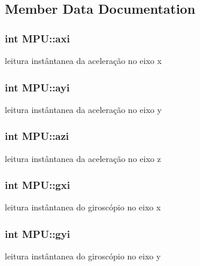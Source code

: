 \subsection{Member Data Documentation}
\subsubsection[{\texorpdfstring{axi}{axi}}]{\setlength{\rightskip}{0pt plus 5cm}int M\+P\+U\+::axi}\hypertarget{class_m_p_u_a970d6ef662d744e848058828d4f20de6}{}\label{class_m_p_u_a970d6ef662d744e848058828d4f20de6}
leitura instântanea da aceleração no eixo x 
\subsubsection[{\texorpdfstring{ayi}{ayi}}]{\setlength{\rightskip}{0pt plus 5cm}int M\+P\+U\+::ayi}\hypertarget{class_m_p_u_a84628559828dd5476ee2a8888d26d2a7}{}\label{class_m_p_u_a84628559828dd5476ee2a8888d26d2a7}
leitura instântanea da aceleração no eixo y 
\subsubsection[{\texorpdfstring{azi}{azi}}]{\setlength{\rightskip}{0pt plus 5cm}int M\+P\+U\+::azi}\hypertarget{class_m_p_u_a8307625db324101f2c1c0db433253b63}{}\label{class_m_p_u_a8307625db324101f2c1c0db433253b63}
leitura instântanea da aceleração no eixo z 
\subsubsection[{\texorpdfstring{gxi}{gxi}}]{\setlength{\rightskip}{0pt plus 5cm}int M\+P\+U\+::gxi}\hypertarget{class_m_p_u_a16a4ca3ef12197ee9876e71033c20f4f}{}\label{class_m_p_u_a16a4ca3ef12197ee9876e71033c20f4f}
leitura instântanea do giroscópio no eixo x 
\subsubsection[{\texorpdfstring{gyi}{gyi}}]{\setlength{\rightskip}{0pt plus 5cm}int M\+P\+U\+::gyi}\hypertarget{class_m_p_u_a5ae8eb6cc6be2a2a91957a34d59dc468}{}\label{class_m_p_u_a5ae8eb6cc6be2a2a91957a34d59dc468}
leitura instântanea do giroscópio no eixo y 

